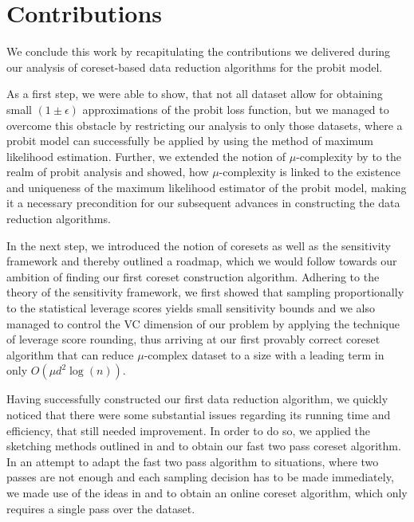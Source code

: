 \section{Contributions}

We conclude this work by recapitulating the contributions we delivered
during our analysis of coreset-based data reduction algorithms
for the probit model.

As a first step, we were able to show, that not all dataset allow
for obtaining small $(1 \pm \epsilon)$ approximations of the
probit loss function, but we
managed to overcome this obstacle by restricting our analysis to only
those datasets, where a probit model can successfully be applied
by using the method of maximum likelihood estimation.
Further, we extended the notion of $\mu$-complexity by
\cite{on-coresets} to the realm of probit analysis and showed, how
$\mu$-complexity is linked to the existence and uniqueness of the
maximum likelihood estimator of the probit model, making it a
necessary precondition for our subsequent advances in constructing the
data reduction algorithms.

In the next step, we introduced the notion of coresets as well as
the sensitivity framework and thereby outlined a roadmap, which we
would follow towards our ambition of finding our first coreset
construction algorithm.
Adhering to the theory of the sensitivity framework, we first
showed that sampling proportionally to the statistical leverage
scores yields small sensitivity bounds and we also managed to
control the VC dimension of our problem
by applying the technique of leverage
score rounding, thus arriving at our first provably correct
coreset algorithm that can reduce $\mu$-complex dataset to
a size with a leading term in only $O(\mu d^2 \log(n))$.

Having successfully constructed our first data reduction algorithm,
we quickly noticed that there were some substantial issues regarding
its running time and efficiency,
that still needed improvement. In order to do so, we applied the sketching
methods outlined in \cite{leverage-scores-drineas} and
\cite{woodruff-2017} to obtain our fast two pass coreset algorithm.
In an attempt to adapt the fast two pass algorithm to situations,
where two passes are not enough and each sampling decision has to
be made immediately, we made use of the ideas in
\cite{online-row-sampling} and \cite{tensor-factorization}
to obtain an online coreset algorithm, which only requires a single
pass over the dataset.

